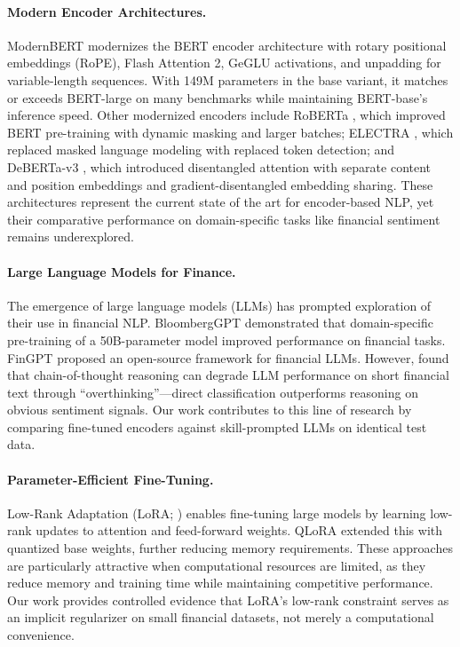 \documentclass[11pt]{article}
\begin{document}
\paragraph{Modern Encoder Architectures.}
ModernBERT \citep{warner2024modernbert} modernizes the BERT encoder architecture with rotary positional embeddings (RoPE), Flash Attention 2, GeGLU activations, and unpadding for variable-length sequences. With 149M parameters in the base variant, it matches or exceeds BERT-large on many benchmarks while maintaining BERT-base's inference speed. Other modernized encoders include RoBERTa \citep{liu2019roberta}, which improved BERT pre-training with dynamic masking and larger batches; ELECTRA \citep{clark2020electra}, which replaced masked language modeling with replaced token detection; and DeBERTa-v3 \citep{he2021debertav3}, which introduced disentangled attention with separate content and position embeddings and gradient-disentangled embedding sharing. These architectures represent the current state of the art for encoder-based NLP, yet their comparative performance on domain-specific tasks like financial sentiment remains underexplored.

\paragraph{Large Language Models for Finance.}
The emergence of large language models (LLMs) has prompted exploration of their use in financial NLP. BloombergGPT \citep{wu2023bloomberggpt} demonstrated that domain-specific pre-training of a 50B-parameter model improved performance on financial tasks. FinGPT \citep{yang2023fingpt} proposed an open-source framework for financial LLMs. However, \citet{vamvourellis2025overthinking} found that chain-of-thought reasoning can degrade LLM performance on short financial text through ``overthinking''---direct classification outperforms reasoning on obvious sentiment signals. Our work contributes to this line of research by comparing fine-tuned encoders against skill-prompted LLMs on identical test data.

\paragraph{Parameter-Efficient Fine-Tuning.}
Low-Rank Adaptation (LoRA; \citealt{hu2022lora}) enables fine-tuning large models by learning low-rank updates to attention and feed-forward weights. QLoRA \citep{dettmers2023qlora} extended this with quantized base weights, further reducing memory requirements. These approaches are particularly attractive when computational resources are limited, as they reduce memory and training time while maintaining competitive performance. Our work provides controlled evidence that LoRA's low-rank constraint serves as an implicit regularizer on small financial datasets, not merely a computational convenience.
\end{document}
